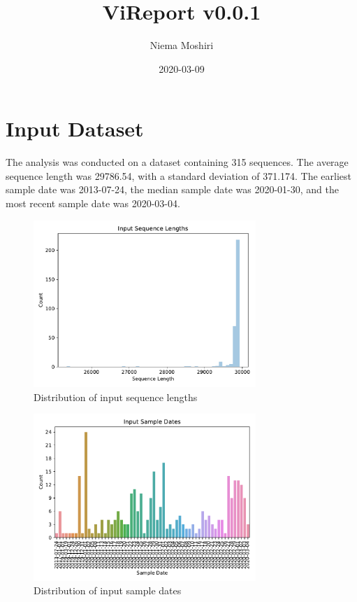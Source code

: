 \documentclass{article}
\title{\vspace{-2.0cm}ViReport v0.0.1}
\author{Niema Moshiri}
\date{2020-03-09}
\begin{document}
\maketitle

\section{Input Dataset}
The analysis was conducted on a dataset containing 315 sequences.
The average sequence length was 29786.54,
with a standard deviation of 371.174.
The earliest sample date was 2013-07-24,
the median sample date was 2020-01-30,
and the most recent sample date was 2020-03-04.


\begin{figure}[h]
\centering
\includegraphics[width=0.75\textwidth,keepaspectratio]{./figs/input_sequence_lengths.pdf}
\caption{Distribution of input sequence lengths}
\end{figure}



\begin{figure}[h]
\centering
\includegraphics[width=0.75\textwidth,keepaspectratio]{./figs/input_sample_dates.pdf}
\caption{Distribution of input sample dates}
\end{figure}
\end{document}
